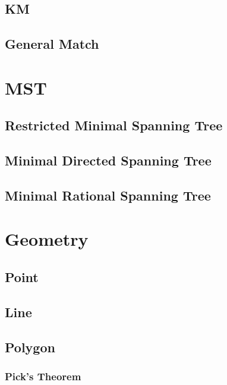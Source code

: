 \documentclass[10pt,twocolumn,oneside]{article}
\begin{document}
    \subsection{KM}
    
    \subsection{General Match}
    
    \newpage

    \section{MST}
    \subsection{Restricted Minimal Spanning Tree}
    
    \subsection{Minimal Directed Spanning Tree}
    
    \subsection{Minimal Rational Spanning Tree}
    
    \newpage
    \section{Geometry}
    \subsection{Point}
    
    \subsection{Line}
    
    \subsection{Polygon}
    
    \subsubsection{Pick's Theorem}
    
\end{document}
